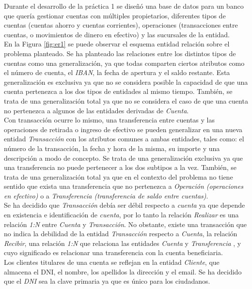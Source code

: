 \documentclass{article}
\begin{document}
Durante el desarrollo de la práctica 1 se diseñó una base de datos para un banco que quería gestionar cuentas con múltiples propietarios, diferentes tipos de cuentas (cuentas ahorro y cuentas corrientes), operaciones (transacciones entre cuentas, o movimientos de dinero en efectivo) y las sucursales de la entidad.\\
En la Figura \ref{fig:er1} se puede observar el esquema entidad relación sobre el problema planteado. Se ha planteado las relaciones entre los distintos tipos de cuentas como una generalización, ya que todas comparten ciertos atributos como el número de cuenta, el \emph{IBAN}, la fecha de apertura y el saldo restante. Esta generalización es exclusiva ya que no se considera posible la capacidad de que una cuenta pertenezca a los dos tipos de entidades al mismo tiempo. También, se trata de una generalización total ya que no se considera el caso de que una cuenta no pertenezca a algunos de las entidades derivadas de \emph{Cuenta}.\\
Con transacción ocurre lo mismo, una transferencia entre cuentas y las operaciones de retirada o ingreso de efectivo se pueden generalizar en una nueva entidad \emph{Transacción} con los atributos comunes a ambas entidades, tales como: el número de la transacción, la fecha y hora de la misma, su importe y una descripción a modo de concepto. Se trata de una generalización exclusiva ya que una transferencia no puede pertenecer a los dos subtipos a la vez. También, se trata de una generalización total ya que en el contexto del problema no tiene sentido que exista una transferencia que no pertenezca a \emph{Operación (operaciones en efectivo)} o a \emph{Transferencia (transferencia de saldo entre cuentas)}.\\
Se ha decidido que \emph{Transacción} debía ser débil respecto a \emph{cuenta} ya que depende en existencia e identificación de \emph{cuenta}, por lo tanto la relación \emph{Realizar} es una relación \emph{1:N} entre \emph{Cuenta} y \emph{Transacción}. No obstante, existe una transacción que no indica la debilidad de la entidad \emph{Transacción} respecto a \emph{Cuenta}, la relación \emph{Recibir}, una relación \emph{1:N} que relaciona las entidades \emph{Cuenta} y \emph{Transferencia} , y cuyo significado es relacionar una transferencia con la cuenta beneficiaria.\\
Los clientes titulares de una cuenta se reflejan en la entidad \emph{Cliente}, que almacena el DNI, el nombre, los apellidos la dirección y el email. Se ha decidido que el \emph{DNI} sea la clave primaria ya que es único para los ciudadanos.\\
\end{document}
